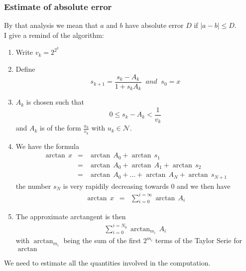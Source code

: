 \documentclass[12pt]{amsart}
\def\N{{\mathcal N}}
\begin{document}
\subsubsection{Estimate of absolute error}
\noindent By that analysis we mean that $a$ and $b$ have absolute error $D$ if $|a-b|\leq D$.\\
I give a remind of the algorithm:
\begin{enumerate}
\item Write $v_k=2^{2^k}$
\item Define 
\begin{equation*}
s_{k+1}=\frac{s_k-A_k}{1+s_kA_k}\;\;and\;\;s_0=x
\end{equation*}
\item $A_k$ is chosen such that
\begin{equation*}
0\leq s_k-A_k<\frac{1}{v_k}
\end{equation*}
and $A_k$ is of the form $\frac{u_k}{v_k}$ with $u_k\in\N$.
\item We have the formula
\begin{equation*}
\begin{array}{rcl}
\arctan\,x
&=&\arctan\,A_0+\arctan\,s_1\\
&=&\arctan\,A_0+\arctan\,A_1+\arctan\,s_2\\
&=&\arctan\,A_0+\dots+\arctan\,A_N+\arctan\,s_{N+1}
\end{array}
\end{equation*}
the number $s_N$ is very rapidily decreasing towards $0$ and we then have
\begin{equation*}
\begin{array}{rcl}
\arctan\,x&=&\sum_{i=0}^{i=\infty}\arctan\,A_i
\end{array}
\end{equation*}
\item The approximate arctangent is then
\begin{equation*}
\begin{array}{rcl}
\sum_{i=0}^{i=N_0}\arctan_{m_i}\,A_i
\end{array}
\end{equation*}
with $\arctan_{m_i}$ being the sum of the first $2^{m_i}$ terms of the Taylor Serie for $\arctan$
\end{enumerate}
We need to estimate all the quantities involved in the computation.
\end{document}
